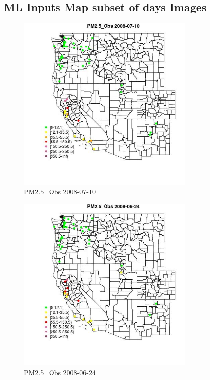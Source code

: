 
\subsection{ML Inputs Map subset of days Images} 
 

\begin{figure} 
\centering  
\includegraphics[width=0.77\textwidth]{Code_Outputs/Report_ML_input_PM25_Step4_part_e_de_duplicated_aves_MapObsPM25_Obs2008-07-10.jpg} 
\caption{\label{fig:Report_ML_input_PM25_Step4_part_e_de_duplicated_avesMapObsPM25_Obs2008-07-10}PM2.5_Obs 2008-07-10} 
\end{figure} 
 

\begin{figure} 
\centering  
\includegraphics[width=0.77\textwidth]{Code_Outputs/Report_ML_input_PM25_Step4_part_e_de_duplicated_aves_MapObsPM25_Obs2008-06-24.jpg} 
\caption{\label{fig:Report_ML_input_PM25_Step4_part_e_de_duplicated_avesMapObsPM25_Obs2008-06-24}PM2.5_Obs 2008-06-24} 
\end{figure} 
 

